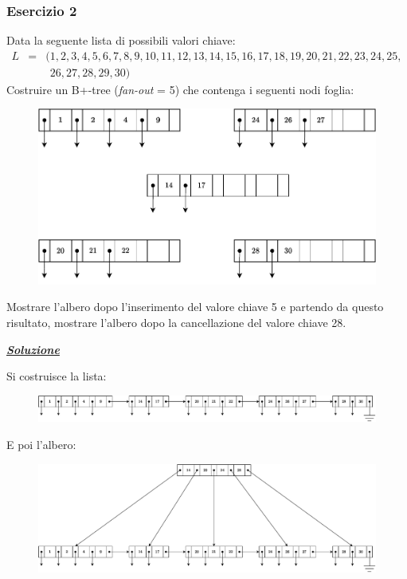 \documentclass[a4paper]{article}
\begin{document}
	\subsubsection{Esercizio 2}
	
	Data la seguente lista di possibili valori chiave:
	\begin{equation*}
		\begin{array}{lll}
			L &=& (1,2,3,4,5,6,7,8,9,10,11,12,13,14,15,16,17,18,19,20,21,22,23,24,25, \\
			&& \phantom{(}26,27,28,29,30)
		\end{array}
	\end{equation*}
	Costruire un B+-tree (\emph{fan-out} = 5) che contenga i seguenti nodi foglia:
	\begin{figure}[!htp]
		\centering
		\includegraphics[width=\textwidth]{img/b+-tree-9.pdf}
	\end{figure}
	
	\noindent
	Mostrare l'albero dopo l'inserimento del valore chiave 5 e partendo da questo risultato, mostrare l'albero dopo la cancellazione del valore chiave 28.\newline
	
	\noindent
	\textcolor{Green4}{\textbf{\emph{\underline{Soluzione}}}}\newline
	
	\noindent
	Si costruisce la lista:
	\begin{figure}[!htp]
		\centering
		\includegraphics[width=\textwidth]{img/b+-tree-10.pdf}
	\end{figure}
	
	\noindent
	E poi l'albero:
	\begin{figure}[!htp]
		\centering
		\includegraphics[width=\textwidth]{img/b+-tree-11.pdf}
	\end{figure}\newpage
	
\end{document}
